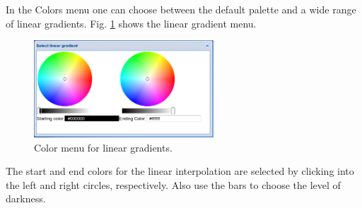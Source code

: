 \documentclass[article,A4,12pt]{llncs}
\begin{document}
In the Colors menu one can choose between the default palette and a wide
range of linear gradients. Fig. \ref{fig:lingrad} shows the linear gradient 
menu.

\begin{figure}[!ht]
\begin{center}
\includegraphics[width=0.6\textwidth]{img/lingrad.png}
\end{center}
\caption{Color menu for linear gradients.}
\label{fig:lingrad}
\end{figure}

\noindent
The start and end colors for the linear interpolation are selected
by clicking into the left and right circles, respectively. Also 
use the bars to choose the level of darkness. 
\end{document}
